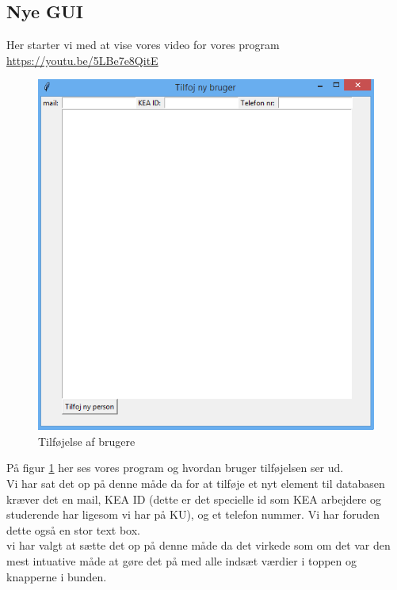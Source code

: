\documentclass[a4paper]{article}
\begin{document}
\subsection{Nye GUI}
Her starter vi med at vise vores video for vores program \url{https://youtu.be/5LBe7e8QitE}\\[0.1in]
\begin{figure}[h!]
\centering
\includegraphics[width=1\textwidth]{Tilfojbruger.png}
\caption{Tilføjelse af brugere}
\label{fig:GUI1}
\end{figure}
På figur \ref{fig:GUI1} her ses vores program og hvordan bruger tilføjelsen ser ud.\\
Vi har sat det op på denne måde da for at tilføje et nyt element til databasen kræver det en mail, KEA ID (dette er det specielle id som KEA arbejdere og studerende har ligesom vi har på KU), og et telefon nummer. Vi har foruden dette også en stor text box.\\[0.1in]
vi har valgt at sætte det op på denne måde da det virkede som om det var den mest intuative måde at gøre det på med alle indsæt værdier i toppen og knapperne i bunden.
\\[0.1in]
\end{document}
